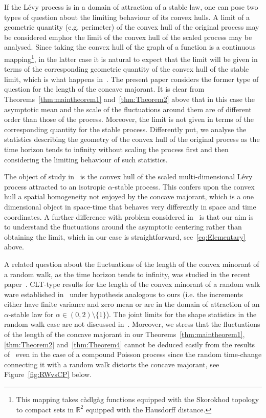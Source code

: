 \documentclass[10pt]{amsart}
\theoremstyle{definition}\newtheorem{defi}[theo]{Definition}\newtheorem{rema}[theo]{Remark}\newtheorem{exam}[theo]{Example}\newtheorem{exem}[theo]{Example}\newtheorem{nota}[theo]{Notation}
\newcommand\R{\mathbb{R}}
\newcommand\1{\mathds{1}}
\newcommand\cadlag{{càdlgàg}}
\begin{document}
If the Lévy process is in a domain of attraction of a stable law, one can pose two types of question about the limiting behaviour of its convex hulls. A limit of a geometric quantity (e.g. perimeter) of the convex hull of the original process may be considered emph{or} the limit of the convex hull of the scaled process may be analysed. Since taking the convex hull of the graph of a function is a continuous mapping\footnote{This mapping takes \cadlag{} functions equipped with the Skorokhod topology to compact sets in $\R^2$ equipped with the Hausdorff distance.}, in the latter case it is natural to expect that the limit will be given in terms of the corresponding geometric quantity of the convex hull of the stable limit, which is what happens in~\cite[Section~5]{MR3564216}. The present paper considers the former type of question for the length of the concave majorant. It is clear from Theorems~\ref{thm:maintheorem1} and~\ref{thm:Theorem2} above that in this case the asymptotic mean and the scale of the fluctuations around them are of different order than those of the process. Moreover, the limit is not given in terms of the corresponding quantity for the stable process. Differently put, we analyse the statistics describing the geometry of the convex hull of the original process as the time horizon tends to infinity without scaling the process first and then considering the limiting behaviour of such statistics.


The object of study in~\cite{MR3564216} is the convex hull of the scaled multi-dimensional Lévy process attracted to an isotropic $\alpha$-stable process. This confers upon the convex hull a spatial homogeneity not enjoyed by the concave majorant, which is a one dimensional object in space-time that behaves very differently in space and time coordinates. A further difference with problem considered in~\cite{MR3564216} is that our aim is to understand the fluctuations around the asymptotic centering rather than obtaining the limit, which in our case is straightforward, see~\eqref{eq:Elementary} above.


A related question about the fluctuations of the length of the convex minorant of a random walk, as the time horizon tends to infinity, was studied in the recent paper~\cite{RWpaper}. CLT-type results for the length of the convex minorant of a random walk ware established in~\cite{RWpaper} under hypothesis analogous to ours (i.e. the increments either have finite variance and zero mean or are in the domain of attraction of an $\alpha$-stable law for $\alpha \in (0,2)\setminus\{1\}$). The joint limits for the shape statistics in the random walk case are not discussed in~\cite{RWpaper}. Moreover, we stress that the fluctuations of the length of the concave majorant in our Theorems~\ref{thm:maintheorem1}, \ref{thm:Theorem2} and~\ref{thm:Theorem4} cannot be deduced easily from the results of~\cite{RWpaper} even in the case of a compound Poisson process since the random time-change connecting it with a random walk distorts the concave majorant, see Figure~\ref{fig:RWvsCP} below.
\end{document}
